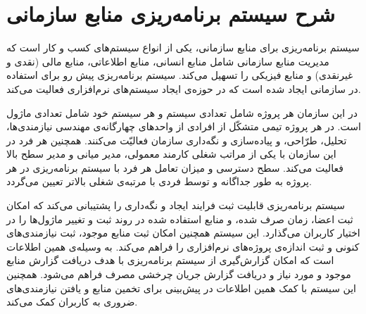\newpage
\section{شرح سیستم برنامه‌ریزی منابع سازمانی}
سیستم برنامه‌ریزی برای منابع سازمانی، یکی از انواع سیستم‌های کسب و کار است که مدیریت منابع سازمانی شامل منابع انسانی، منابع اطلاعاتی، منابع مالی (نقدی و غیرنقدی) و منابع فیزیکی را تسهیل می‌کند. سیستم برنامه‌ریزی پیش رو برای استفاده در سازمانی ایجاد شده است که در حوزه‌ی ایجاد سیستم‌های نرم‌افزاری فعالیت می‌کند. \par
در این سازمان هر پروژه شامل تعدادی سیستم و هر سیستم خود شامل تعدادی ماژول است. در هر پروژه تیمی متشکّل از افرادی از واحدهای چهارگانه‌ی مهندسی نیازمندی‌ها، تحلیل، طرّاحی، و پیاده‌سازی و نگه‌داری سازمان فعالیّت می‌کنند. همچنین هر فرد در این سازمان با یکی از مراتب شغلی کارمند معمولی، مدیر میانی و مدیر سطح بالا فعالیت می‌کند. سطح دسترسی و میزان تعامل هر فرد با سیستم برنامه‌ریزی در هر پروژه به طور جداگانه و توسط فردی با مرتبه‌ی شغلی بالاتر تعیین می‌گردد. \par
سیستم برنامه‌ریزی قابلیت ثبت فرایند ایجاد و نگه‌داری را پشتیبانی می‌کند که امکان ثبت اعضا، زمان صرف شده، و منابع استفاده شده در روند ثبت و تغییر ماژول‌ها را در اختیار کاربران می‌گذارد. این سیستم همچنین امکان ثبت منابع موجود، ثبت نیازمندی‌های کنونی و ثبت اندازه‌ی پروژه‌های نرم‌افزاری را فراهم می‌کند. به وسیله‌ی همین اطلاعات است که امکان گزارش‌گیری از سیستم برنامه‌ریزی با هدف دریافت گزارش منابع موجود و مورد نیاز و دریافت گزارش جریان چرخشی مصرف فراهم می‌شود. همچنین این سیستم با کمک همین اطلاعات در پیش‌بینی برای تخمین منابع و یافتن نیازمندی‌های ضروری به کاربران کمک می‌کند. \par

